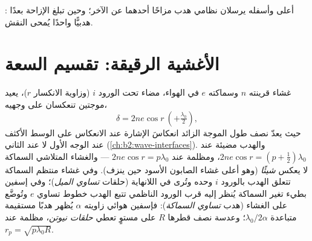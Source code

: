 \begin{omfigure}

{\small {}: أعلى  وأسفله
يرسلان نظامي هدب مزاحًا أحدهما عن الآخر؛ وحين تبلغ الإزاحة
بعدًا هدبيًّا واحدًا يُمحى النقش.}
\end{omfigure}

\section{الأغشية الرقيقة: تقسيم السعة}

\begin{proposition}\label{prop:b2:two-wave-interference:film}
غشاء قرينته $n$ وسماكته $e$ في الهواء، مضاء تحت الورود $i$
(وزاوية الانكسار $r$)، يعيد موجتين تنعكسان على وجهيه،
\[
\delta = 2ne\cos r \ (+\tfrac{\lambda_0}2) ,
\]
حيث يعدّ نصف طول الموجة الزائد انعكاسَ الإشارة عند الانعكاس
على الوسط الأكثف عند الوجه الأول لا عند الثاني
(\cref{ch:b2:wave-interfaces}). والهدب مضيئة عند $2ne\cos r =
(p + \tfrac12)\lambda_0$، ومظلمة عند $2ne\cos r = p\lambda_0$ --- والغشاء المتلاشي
السماكة لا يعكس \emph{شيئًا} (وهو أعلى غشاء الصابون الأسود
حين ينزف). وفي غشاء منتظم السماكة تتعلق الهدب بالورود $i$ وحده
وتُرى في اللانهاية (حلقات \emph{تساوي الميل})؛ وفي إسفين
بطيء تغير السماكة يُنظر إليه قرب الورود الناظمي تتبع الهدب
خطوط تساوي $e$ وتُوضَّع على الغشاء
(هدب \emph{تساوي السماكة}): فإسفين هوائي زاويته $\alpha$ يُظهر
هدبًا مستقيمة متباعدة $\lambda_0/2\alpha$؛ وعدسة نصف قطرها $R$ على مستوٍ تعطي
\emph{حلقات نيوتن}، مظلمة عند $r_p = \sqrt{p\lambda_0R}$.
\end{proposition}

